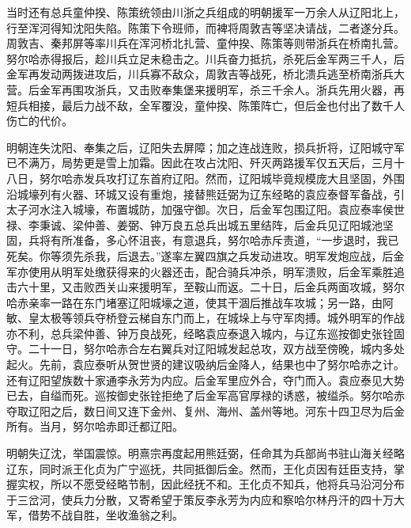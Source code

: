 当时还有总兵童仲揆、陈策统领由川浙之兵组成的明朝援军一万余人从辽阳北上，行至浑河得知沈阳失陷。陈策下令班师，而裨将周敦吉等坚决请战，二者遂分兵。周敦吉、秦邦屏等率川兵在浑河桥北扎营、童仲揆、陈策等则带浙兵在桥南扎营。努尔哈赤得报后，趁川兵立足未稳击之。川兵奋力抵抗，杀死后金军两三千人，后金军再发动两拨进攻后，川兵寡不敌众，周敦吉等战死，桥北溃兵逃至桥南浙兵大营。后金军再围攻浙兵，又击败奉集堡来援明军，杀三千余人。浙兵先用火器，再短兵相接，最后力战不敌，全军覆没，童仲揆、陈策阵亡，但后金也付出了数千人伤亡的代价。

明朝连失沈阳、奉集之后，辽阳失去屏障；加之连战连败，损兵折将，辽阳城守军已不满万，局势更是雪上加霜。因此在攻占沈阳、歼灭两路援军仅五天后，三月十八日，努尔哈赤发兵攻打辽东首府辽阳。然而，辽阳城毕竟规模庞大且坚固，外围沿城壕列有火器、环城又设有重炮，接替熊廷弼为辽东经略的袁应泰督军备战，引太子河水注入城壕，布置城防，加强守御。次日，后金军包围辽阳。袁应泰率侯世禄、李秉诚、梁仲善、姜弼、钟万良五总兵出城五里结阵，后金兵见辽阳城池坚固，兵将有所准备，多心怀沮丧，有意退兵，努尔哈赤斥责道，“一步退时，我已死矣。你等须先杀我，后退去。”遂率左翼四旗之兵发动进攻。明军发炮应战，后金军亦使用从明军处缴获得来的火器还击，配合骑兵冲杀，明军溃败，后金军乘胜追击六十里，又击败西关山来援明军，至鞍山而返。二十日，后金兵两面攻城，努尔哈赤亲率一路在东门堵塞辽阳城壕之道，使其干涸后推战车攻城；另一路，由阿敏、皇太极等领兵夺桥登云梯自东门而上，在城垛上与守军肉搏。城外明军的作战亦不利，总兵梁仲善、钟万良战死，经略袁应泰退入城内，与辽东巡按御史张铨固守。二十一日，努尔哈赤合左右翼兵对辽阳城发起总攻，双方战至傍晚，城内多处起火。先前，袁应泰听从贺世贤的建议吸纳后金降人，结果也中了努尔哈赤之计。还有辽阳望族数十家通李永芳为内应。后金军里应外合，夺门而入。袁应泰见大势已去，自缢而死。巡按御史张铨拒绝了后金军高官厚禄的诱惑，被缢杀。努尔哈赤夺取辽阳之后，数日间又连下金州、复州、海州、盖州等地。河东十四卫尽为后金所有。当月，努尔哈赤即迁都辽阳。

明朝失辽沈，举国震惊。明熹宗再度起用熊廷弼，任命其为兵部尚书驻山海关经略辽东，同时派王化贞为广宁巡抚，共同抵御后金。然而，王化贞因有廷臣支持，掌握实权，所以不愿受经略节制，因此经抚不和。王化贞不知兵，他将兵马沿河分布于三岔河，使兵力分散，又寄希望于策反李永芳为内应和察哈尔林丹汗的四十万大军，借势不战自胜，坐收渔翁之利。

